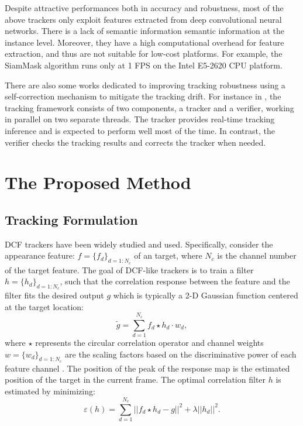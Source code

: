 \documentclass[review]{elsarticle}
\begin{document}
\begin{CJK*}{UTF8}{gbsn}
Despite attractive performances both in accuracy and robustness, most of the above trackers only exploit features extracted from deep convolutional neural networks. There is a lack of semantic information semantic information at the instance level. Moreover, they have a high computational overhead for feature extraction, and thus are not suitable for low-cost platforms. For example, the SiamMask algorithm runs only at 1 FPS on the Intel E5-2620 CPU platform.

There are also some works dedicated to improving tracking robustness using a self-correction mechanism to mitigate the tracking drift. For instance in \cite{fan2017parallel}, the tracking framework consists of two components, a tracker and a verifier, working in parallel on two separate threads. The tracker provides real-time tracking inference and is expected to perform well most of the time. In contrast, the verifier checks the tracking results and corrects the tracker when needed.

\section{The Proposed Method}

\subsection{Tracking Formulation} \label{sec:InstMask}
DCF trackers \cite{Bolme2010VisualOT, Danelljan2014AccurateSE, Henriques2015HighSpeedTW, Li2014ASA} have been widely studied and used. Specifically, consider the appearance feature: $f=\{f_d\}_{d=1:N_c}$ of an target, where $N_c$ is the channel number of the target feature. The goal of DCF-like trackers is to train a filter $h=\{h_d\}_{d=1:N_c}$, such that the correlation response between the feature and the filter fits the desired output $g$ which is typically a 2-D Gaussian function centered at the target location: 
\begin{equation} \label{eq:dcf}
\tilde{g}=\sum_{d=1}^{N_c}f_d \star h_d \cdot w_d,
\end{equation}
where $\star$ represents the circular correlation operator and channel weights $w = \{w_d\}_{d=1:N_c}$ are the scaling factors based on the discriminative power of each feature channel \cite{Lukezic2017DiscriminativeCF}.
The position of the peak of the response map is the estimated position of the target in the current frame.
The optimal correlation filter $h$ is estimated by minimizing:
\begin{equation}
\varepsilon(h) = \sum_{d=1}^{N_c}||f_d \star h_d - g||^2+\lambda||h_d||^2.
\end{equation}


\end{CJK*}
\end{document}
